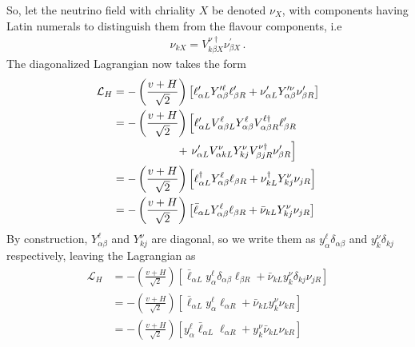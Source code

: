 So, let the neutrino field with chriality $X$ be denoted $\nu_X$, with components having Latin numerals to distinguish them from the flavour components, i.e 
\begin{align}\label{eq:nu_rotation}
    \nu_{k X} =  V_{k\beta X}^{\nu \dagger} \nu_{\beta X}^\prime\,.
\end{align}
The diagonalized Lagrangian now takes the form 
\begin{align}
    \mathcal{L}_{H} &= -\left( \frac{v + H}{\sqrt{2}} \right) \left[\ell_{\alpha L}^{\prime} Y_{\alpha \beta}^{\prime \ell} \ell_{\beta R}^{\prime} + \nu_{\alpha L}^{\prime} Y_{\alpha \beta}^{\prime \nu} \nu_{\beta R}^{\prime}\right] \nonumber \\
    &= -\left( \frac{v + H}{\sqrt{2}} \right) \left[\ell_{\alpha L}^{\prime} V_{\alpha \beta L}^{\ell} Y_{\alpha \beta}^{ \ell} V_{\alpha \beta R}^{\ell \dagger} \ell_{\beta R}^{\prime}\right. \nonumber \\
    &\hspace{5.7em}+\left. \nu_{\alpha L}^{\prime} V_{\alpha k L}^{\nu} Y_{kj}^{\nu} V_{\beta j  R}^{\nu \dagger} \nu_{\beta R}^{\prime}\right] \nonumber \\
    &= -\left( \frac{v + H}{\sqrt{2}} \right) \left[\ell_{\alpha L}^\dagger Y_{\alpha \beta}^{ \ell} \ell_{\beta R} + \nu_{k L}^{\dagger} Y_{kj}^{ \nu} \nu_{j R}\right] \nonumber \\
    &= -\left( \frac{v + H}{\sqrt{2}} \right) \left[\bar{\ell}_{\alpha L} Y_{\alpha \beta}^{ \ell} \ell_{\beta R} + \bar{\nu}_{k L} Y_{kj}^\nu \nu_{j R}\right]
\end{align}
By construction, $Y^\ell_{\alpha \beta}$ and $Y^\nu_{kj}$ are diagonal, so we write them as $y_{\alpha}^{\ell} \delta_{\alpha \beta}$ and $y_{k}^{\nu} \delta_{k j}$ respectively, leaving the Lagrangian as 
\begin{align}\label{eq:L_H}
    \mathcal{L}_{H} 
    &=-\left( \frac{v + H}{\sqrt{2}} \right) \left[\bar{\ell}_{\alpha L} y_{\alpha}^{\ell} \delta_{\alpha \beta} \ell_{\beta R} + \bar{\nu}_{k L} y_{k}^{\nu} \delta_{k j} \nu_{j R}\right] \nonumber \\
    &=-\left( \frac{v + H}{\sqrt{2}} \right) \left[\bar{\ell}_{\alpha L} y_{\alpha}^{\ell}  \ell_{\alpha R} + \bar{\nu}_{k L} y_{k}^{\nu} \nu_{k R}\right] \nonumber \\
    &=-\left( \frac{v + H}{\sqrt{2}} \right) \left[ y_{\alpha}^{\ell}  \bar{\ell}_{\alpha L}\ell_{\alpha R} +  y_{k}^{\nu}\bar{\nu}_{k L} \nu_{k R}\right] 
\end{align}

